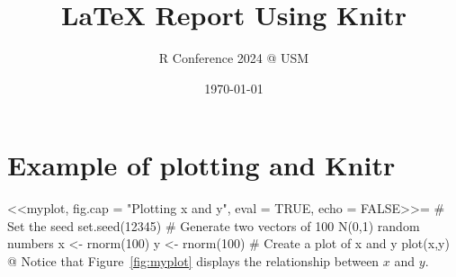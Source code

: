 \documentclass[english, 11pt]{article}
\title{\LaTeX{} Report Using Knitr}
\author{R Conference 2024 @ USM}
\date{\today}
\begin{document}
\maketitle

\section{Example of plotting and Knitr}

<<myplot, fig.cap = "Plotting x and y", eval = TRUE, echo = FALSE>>=
# Set the seed
set.seed(12345)
# Generate two vectors of 100 N(0,1) random numbers
x <- rnorm(100)
y <- rnorm(100)
# Create a plot of x and y
plot(x,y)
@
Notice that Figure~\ref{fig:myplot} displays the relationship between $x$ and $y$.
\end{document}
